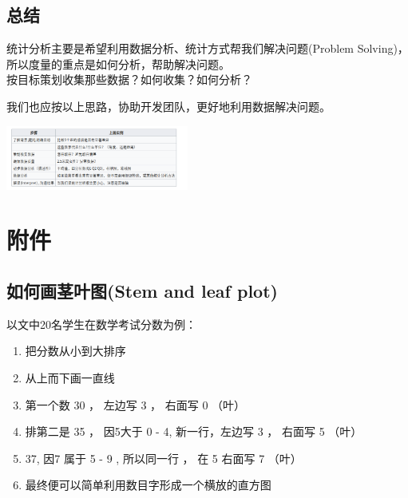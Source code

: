 
\hypertarget{ux5982ux4f55ux753bux830eux53f6ux56festem-and-leaf-plot}{%
\subsection{总结}\label{ux5982ux4f55ux753bux830eux53f6ux56festem-and-leaf-plot}}


统计分析主要是希望利用数据分析、统计方式帮我们解决问题(Problem
Solving)，所以度量的重点是如何分析，帮助解决问题。\\
按目标策划收集那些数据？如何收集？如何分析？

我们也应按以上思路，协助开发团队，更好地利用数据解决问题。

\includegraphics[width=6cm]{Screenshotfrom2023-04-1621-32-07.png}

\hypertarget{ux9644ux4ef6}{%
\section{附件}\label{ux9644ux4ef6}}

\hypertarget{ux5982ux4f55ux753bux830eux53f6ux56festem-and-leaf-plot}{%
\subsection{如何画茎叶图(Stem and leaf
plot)}\label{ux5982ux4f55ux753bux830eux53f6ux56festem-and-leaf-plot}}

以文中20名学生在数学考试分数为例：

\begin{enumerate}
\tightlist
\item
  把分数从小到大排序
\item
  从上而下画一直线
\item
  第一个数 30 ， 左边写 3 ， 右面写 0 （叶）
\item
  排第二是 35 ， 因5大于 0 - 4, 新一行，左边写 3 ， 右面写 5 （叶）
\item
  37, 因7 属于 5 - 9 , 所以同一行 ， 在 5 右面写 7 （叶）
\item
  最终便可以简单利用数目字形成一个横放的直方图
\end{enumerate}

